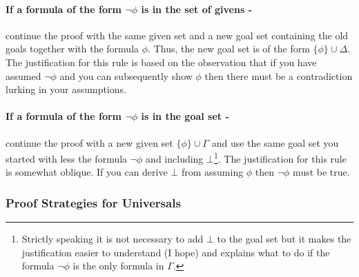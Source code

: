 \documentclass[11pt]{article}
\newcommand{\rbreak}{\ \\}
\newcommand{\NamedSequentRule}[3]{{\mbox{{\begin{tabular}{c} {\mbox{$#1$}}\vspace{.25em}\\ \hline \vspace{.25em} {\mbox{$#2$}} \end{tabular}}{\hspace{.5em}{#3}}}}}
\begin{document}
\paragraph{If a formula of the form $\neg\phi$ is in the set of givens
  -}continue the proof with the same given set and a new goal set containing
the old goals together with the formula $\phi$.  Thus, the new goal set is of
the form $\{\phi\}\cup\Delta$.  The justification for this rule is based on the
observation that if you have assumed $\neg\phi$ and you can subsequently show
$\phi$ then there must be a contradiction lurking in your assumptions.

\paragraph{If a formula of the form $\neg\phi$ is in the goal set - } continue
the proof with a new given set $\{\phi\}\cup\Gamma$ and use the same goal set
you started with less the formula $\neg\phi$ and including
$\bot$\footnote{Strictly speaking it is not necessary to add $\bot$ to the goal
  set but it makes the justification easier to understand (I hope) and explains
  what to do if the formula $\neg\phi$ is the only formula in $\Gamma$.}.  The
justification for this rule is somewhat oblique.  If you can derive $\bot$ from
assuming $\phi$ then $\neg\phi$ must be true.  






\subsubsection{Proof Strategies for Universals}
\end{document}
